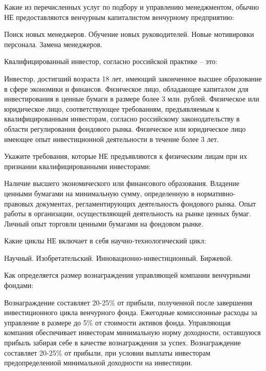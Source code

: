 \documentclass[12pt, table]{exam}
\begin{document}
\begin{questions}
\begin{multicols}{2}
\question Какие из перечисленных услуг по подбору и управлению менеджментом, обычно НЕ предоставляются венчурным капиталистом венчурному предприятию:
\begin{choices}
	\choice Поиск новых менеджеров.
	\CC Обучение новых руководителей.
	\choice Новые мотивировки персонала.
	\choice Замена менеджеров.
\end{choices}

\question Квалифицированный инвестор, согласно российской практике – это:
\begin{choices}
	\choice Инвестор, достигший возраста 18 лет, имеющий законченное высшее образование в сфере экономики и финансов.
	\choice Физическое лицо, обладающее капиталом для инвестирования в ценные бумаги в размере более 3 млн. рублей.
	\CC Физическое или юридическое лицо, соответствующее требованиям, предъявляемым к квалифицированным инвесторам, согласно российскому законодательству в области регулирования фондового рынка.
	\choice Физическое или юридическое лицо имеющее опыт инвестиционной деятельности в течение более 3 лет.
\end{choices}

\question Укажите требования, которые НЕ предъявляются к физическим лицам при их признании квалифицированными инвесторами:
\begin{choices}
	\CC Наличие высшего экономического или финансового образования.
	\choice Владение ценными бумагами на минимальную сумму, определенную в нормативно-правовых документах, регламентирующих деятельность фондового рынка.
	\choice Опыт работы в организации, осуществляющей деятельность на рынке ценных бумаг.
	\choice Личный опыт торговли ценными бумагами на фондовом рынке.
\end{choices}

\question Какие циклы НЕ включает в себя научно-технологический цикл:
\begin{choices}
	\choice Научный.
	\choice Изобретательский.
	\choice Инновационно-инвестиционный.
	\CC Биржевой.
\end{choices}

\question Как определяется размер вознаграждения управляющей компании венчурными фондами:
\begin{choices}
	\choice Вознаграждение составляет 20-25\% от прибыли, полученной после завершения инвестиционного цикла венчурного фонда.
	\choice Ежегодные комиссионные расходы за управление в размере до 5\% от стоимости активов фонда.
	\choice Управляющая компания обеспечивает инвесторам минимальную норму доходности, оставшуюся прибыль забирая себе в качестве вознаграждения за успех.
	\CC Вознаграждение составляет 20-25\% от прибыли, при условии выплаты инвесторам предопределенной минимальной доходности на инвестиции.
\end{choices}


\end{multicols}
\end{questions}
\end{document}

